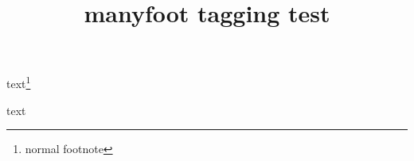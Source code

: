 \documentclass{article}
\title{manyfoot tagging test}
\begin{document}
text\footnote{normal footnote}

text

\end{document}
